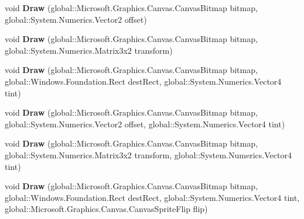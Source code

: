 \begin{DoxyCompactItemize}
void {\bfseries Draw} (global\+::\+Microsoft.\+Graphics.\+Canvas.\+Canvas\+Bitmap bitmap, global\+::\+System.\+Numerics.\+Vector2 offset)
\item 
\mbox{\label{class_microsoft_1_1_graphics_1_1_canvas_1_1_canvas_sprite_batch_a65cba582c2a39f5ba39b6b335f662889}} 
void {\bfseries Draw} (global\+::\+Microsoft.\+Graphics.\+Canvas.\+Canvas\+Bitmap bitmap, global\+::\+System.\+Numerics.\+Matrix3x2 transform)
\item 
\mbox{\label{class_microsoft_1_1_graphics_1_1_canvas_1_1_canvas_sprite_batch_ac6a57c21e98d51e115cc80bfc708824f}} 
void {\bfseries Draw} (global\+::\+Microsoft.\+Graphics.\+Canvas.\+Canvas\+Bitmap bitmap, global\+::\+Windows.\+Foundation.\+Rect dest\+Rect, global\+::\+System.\+Numerics.\+Vector4 tint)
\item 
\mbox{\label{class_microsoft_1_1_graphics_1_1_canvas_1_1_canvas_sprite_batch_af83f6d164806efe2c3b5584aacf35266}} 
void {\bfseries Draw} (global\+::\+Microsoft.\+Graphics.\+Canvas.\+Canvas\+Bitmap bitmap, global\+::\+System.\+Numerics.\+Vector2 offset, global\+::\+System.\+Numerics.\+Vector4 tint)
\item 
\mbox{\label{class_microsoft_1_1_graphics_1_1_canvas_1_1_canvas_sprite_batch_a37f363ad9485bacdf1870d5fcac66390}} 
void {\bfseries Draw} (global\+::\+Microsoft.\+Graphics.\+Canvas.\+Canvas\+Bitmap bitmap, global\+::\+System.\+Numerics.\+Matrix3x2 transform, global\+::\+System.\+Numerics.\+Vector4 tint)
\item 
\mbox{\label{class_microsoft_1_1_graphics_1_1_canvas_1_1_canvas_sprite_batch_a539c34e4dd073937d6e282aff3ac5fa3}} 
void {\bfseries Draw} (global\+::\+Microsoft.\+Graphics.\+Canvas.\+Canvas\+Bitmap bitmap, global\+::\+Windows.\+Foundation.\+Rect dest\+Rect, global\+::\+System.\+Numerics.\+Vector4 tint, global\+::\+Microsoft.\+Graphics.\+Canvas.\+Canvas\+Sprite\+Flip flip)
\item 
\mbox{\label{class_microsoft_1_1_graphics_1_1_canvas_1_1_canvas_sprite_batch_a6ce7fa9de20ecdd859df4d33baa22b96}} 

\end{DoxyCompactItemize}
